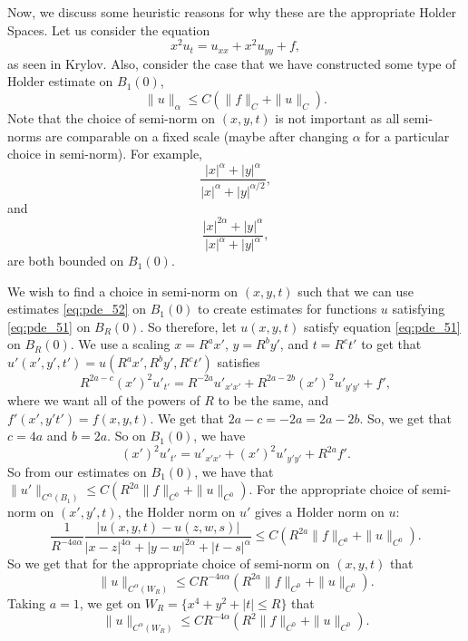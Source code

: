 Now, we discuss some heuristic reasons for why these are the appropriate Holder Spaces. Let us consider the equation
\begin{equation}\label{eq:pde_51}
x^2 u_t = u_{xx} + x^2 u_{yy} + f,
\end{equation}
as seen in Krylov\cite{krylov}. Also, consider the case that we have constructed some type of Holder estimate on $B_1(0)$,
\begin{equation}\label{eq:pde_52}
\|u\|_\alpha \leq C (\|f\|_C+\|u\|_C).
\end{equation}
Note that the choice of semi-norm on $(x,y,t)$ is not important as all semi-norms are comparable on a fixed scale (maybe after changing $\alpha$ for a particular choice in semi-norm). For example,
\begin{equation}
\frac{|x|^\alpha + |y|^\alpha}{|x|^{\alpha} + |y|^{\alpha/2}},
\end{equation}
and
\begin{equation}
\frac{|x|^{2\alpha} + |y|^\alpha}{|x|^\alpha + |y|^\alpha},
\end{equation}
are both bounded on $B_1(0)$.

We wish to find a choice in semi-norm on $(x,y,t)$ such that we can use estimates \eqref{eq:pde_52} on $B_1(0)$ to create estimates for functions $u$ satisfying \eqref{eq:pde_51} on $B_R(0)$. So therefore, let $u(x,y,t)$ satisfy equation \eqref{eq:pde_51} on $B_R(0)$. We use a scaling $x = R^a x'$, $y = R^by'$, and $t = R^c t'$ to get that $u'(x',y',t') =  u(R^a x', R^b y', R^c t')$ satisfies
\begin{equation}
R^{2a-c}(x')^2 u'_{t'} = R^{-2a}u'_{x'x'} + R^{2a-2b}(x')^2 u'_{y'y'} + f',
\end{equation}
where we want all of the powers of $R$ to be the same, and $f'(x',y't') = f(x,y,t)$. We get that $2a-c = -2a = 2a-2b$. So, we get that $c = 4a$ and $b = 2a$. So on $B_1(0)$, we have
\begin{equation}
(x')^2 u'_{t'} = u'_{x'x'} + (x')^2 u'_{y'y'} + R^{2a} f'.
\end{equation}
So from our estimates on $B_1(0)$, we have that $\|u'\|_{C^\alpha(B_1)} \leq C (R^{2a}\|f\|_{C^0}+\|u\|_{C^0})$. For the appropriate choice of semi-norm on $(x',y',t)$, the Holder norm on $u'$ gives a Holder norm on $u$:
\begin{equation}
\frac{1}{R^{-4a\alpha}}\frac{|u(x,y,t) - u( z,w,s)|}{|x-z|^{4\alpha} + |y-w|^{2\alpha}+|t-s|^\alpha} \leq C(R^{2a}\|f\|_{C^0}+\|u\|_{C^0}).
\end{equation}
So we get that for the appropriate choice of semi-norm on $(x,y,t)$ that
\begin{equation}
\|u\|_{C^\alpha(W_R)} \leq C R^{-4a\alpha} (R^{2a}\|f\|_{C^0}+\|u\|_{C^0}).
\end{equation}
Taking $a=1$, we get on $W_R = \{x^4 + y^2 + |t| \leq R \}$ that
\begin{equation}
\|u\|_{C^\alpha(W_R)} \leq C R^{-4\alpha} (R^2\|f\|_{C^0}+\|u\|_{C^0}).
\end{equation}